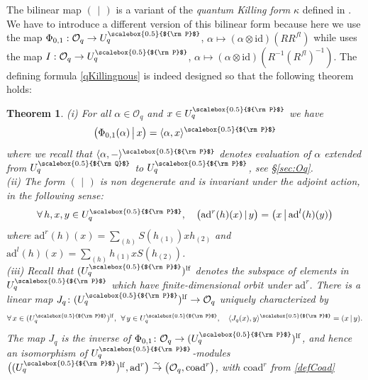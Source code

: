 \documentclass[11pt]{amsart}
\newtheorem{teo}{Theorem}[section]
\newcommand{\Oo}{\mathcal{O}}
\newcommand{\Q}{{\scalebox{0.5}{${\rm Q}$}}}
\newcommand{\Pup}{{\scalebox{0.5}{${\rm P}$}}}
\begin{document}
\indent The bilinear map $(\:\,|\,\:)$ is a variant of the {\em quantum Killing form} $\kappa$ defined in \cite[Def.\,3.78]{VY}. We have to introduce a different version of this bilinear form because here we use the map $\Phi_{0,1} : \mathcal{O}_q \to U_q^\Pup$, $\alpha \mapsto (\alpha \otimes \mathrm{id})(RR^{fl})$ while \cite{VY} uses the map $I : \mathcal{O}_q \to U_q^\Pup$, $\alpha \mapsto (\alpha \otimes \mathrm{id})(R^{-1}(R^{fl})^{-1})$. The defining formula \eqref{qKillingnous} is indeed designed so that the following theorem holds:
\begin{teo}\label{teoqKillingnous}
(i) For all $\alpha \in \mathcal{O}_q$ and $x \in U_q^\Pup$ we have
\begin{equation}\label{relationEntrePhi01EtKilling}
\bigl( \Phi_{0,1}(\alpha) \,\big|\, x \bigr) = \langle \alpha, x \rangle^\Pup
\end{equation}
where we recall that $\langle \alpha, - \rangle^\Pup$ denotes evaluation of $\alpha$ extended from $U_q^\Q$ to $U_q^\Pup$, see \S\ref{sec:Oq}.
\\(ii) The form $(\:\,|\,\:)$ is non degenerate and is invariant under the adjoint action, in the following sense:
\[ \forall \, h,x,y\in U_q^\Pup, \quad \bigl(\mathrm{ad}^r(h)(x) \,|\, y \bigr) = \bigl( x \,\big|\, \mathrm{ad}^l(h)(y) \bigr) \]
where $\mathrm{ad}^r(h)(x) = \textstyle \sum_{(h)} S(h_{(1)})xh_{(2)}$ and $\mathrm{ad}^l(h)(x) = \textstyle \sum_{(h)} h_{(1)}xS(h_{(2)})$.
\\(iii)  Recall that $(U_q^\Pup)^{\mathrm{lf}}$ denotes the subspace of elements in $U_q^\Pup$ which have finite-dimensional orbit under $\mathrm{ad}^r$. There is a linear map $J_q\colon (U_q^\Pup)^{\rm lf} \to \Oo_q$ uniquely characterized by
\[ \forall \, x \in (U_q^\Pup)^{\mathrm{lf}}, \:\: \forall \, y \in U_q^\Pup, \quad \langle J_q(x),y\rangle^\Pup = (x \,|\, y). \]
The map $J_q$ is the inverse of $\Phi_{0,1}\colon \Oo_q\to (U_q^\Pup)^{\rm lf}$, and hence an isomorphism of $U_q^\Pup$-modules $\bigl( (U_q^\Pup)^{\mathrm{lf}}, \mathrm{ad}^r \bigr) \overset{\sim}{\to} \bigl( \mathcal{O}_q, \mathrm{coad}^r \bigr)$, with $\mathrm{coad}^r$ from \eqref{defCoad}
\end{teo}
\end{document}
